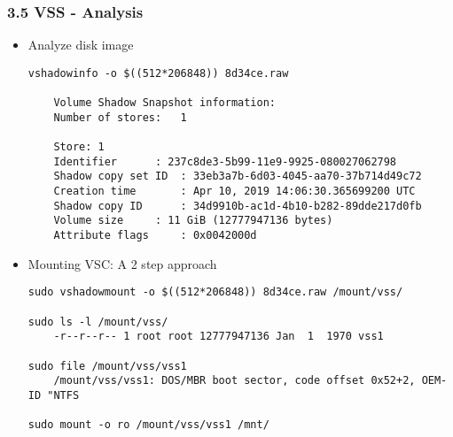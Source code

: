 \begin{frame}[fragile]
  \frametitle{3.5 VSS - Analysis}
    \begin{itemize}
	    \item[] Analyze disk image
  \begin{lstlisting}[basicstyle=\tiny]
vshadowinfo -o $((512*206848)) 8d34ce.raw 

    Volume Shadow Snapshot information:
	Number of stores:	1

    Store: 1
	Identifier		: 237c8de3-5b99-11e9-9925-080027062798
	Shadow copy set ID	: 33eb3a7b-6d03-4045-aa70-37b714d49c72
	Creation time		: Apr 10, 2019 14:06:30.365699200 UTC
	Shadow copy ID		: 34d9910b-ac1d-4b10-b282-89dde217d0fb
	Volume size		: 11 GiB (12777947136 bytes)
	Attribute flags		: 0x0042000d
  \end{lstlisting}
	    \item[] Mounting VSC: A 2 step approach
  \begin{lstlisting}[basicstyle=\tiny]
sudo vshadowmount -o $((512*206848)) 8d34ce.raw /mount/vss/

sudo ls -l /mount/vss/
	-r--r--r-- 1 root root 12777947136 Jan  1  1970 vss1

sudo file /mount/vss/vss1
	/mount/vss/vss1: DOS/MBR boot sector, code offset 0x52+2, OEM-ID "NTFS 

sudo mount -o ro /mount/vss/vss1 /mnt/
  \end{lstlisting}
  \end{itemize}
\end{frame}



